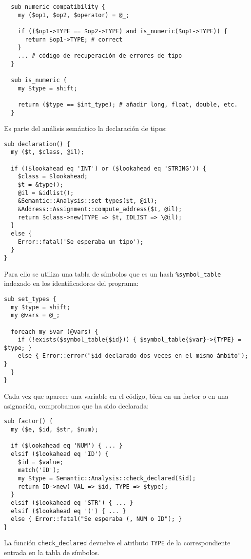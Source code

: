 \begin{verbatim}
  sub numeric_compatibility {
    my ($op1, $op2, $operator) = @_;

    if (($op1->TYPE == $op2->TYPE) and is_numeric($op1->TYPE)) {
      return $op1->TYPE; # correct
    }
    ... # código de recuperación de errores de tipo
  }

  sub is_numeric {
    my $type = shift;

    return ($type == $int_type); # añadir long, float, double, etc.
  }
\end{verbatim}

Es parte del análisis semántico la declaración de tipos:

\begin{verbatim}
sub declaration() {
  my ($t, $class, @il);

  if (($lookahead eq 'INT') or ($lookahead eq 'STRING')) {
    $class = $lookahead;
    $t = &type();
    @il = &idlist();
    &Semantic::Analysis::set_types($t, @il);
    &Address::Assignment::compute_address($t, @il);
    return $class->new(TYPE => $t, IDLIST => \@il);
  }
  else {
    Error::fatal('Se esperaba un tipo');
  }
}
\end{verbatim}
Para ello se utiliza una tabla de símbolos que es un hash \verb|%symbol_table|
indexado en los identificadores del programa:

\begin{verbatim}
sub set_types {
  my $type = shift;
  my @vars = @_;

  foreach my $var (@vars) {
    if (!exists($symbol_table{$id})) { $symbol_table{$var}->{TYPE} = $type; }
    else { Error::error("$id declarado dos veces en el mismo ámbito"); }
  }
}
\end{verbatim}

Cada vez que aparece una variable en el código, bien en un factor o en 
una asignación, comprobamos que ha sido declarada:

\begin{verbatim}
sub factor() {
  my ($e, $id, $str, $num);

  if ($lookahead eq 'NUM') { ... }
  elsif ($lookahead eq 'ID') {
    $id = $value;
    match('ID');
    my $type = Semantic::Analysis::check_declared($id);
    return ID->new( VAL => $id, TYPE => $type);
  }
  elsif ($lookahead eq 'STR') { ... }
  elsif ($lookahead eq '(') { ... }
  else { Error::fatal("Se esperaba (, NUM o ID"); }
}
\end{verbatim}

La función \verb|check_declared| devuelve el atributo
\verb|TYPE| de la correspondiente entrada en la tabla de 
símbolos.

